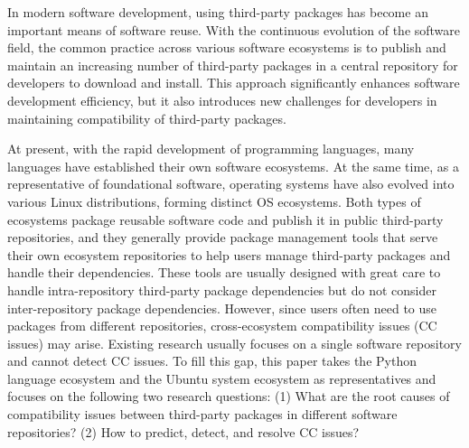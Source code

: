 \begin{eabstract}
In modern software development, using third-party packages has become an important means of software reuse.
With the continuous evolution of the software field, the common practice across various software ecosystems is to publish and maintain an increasing number of third-party packages in a central repository for developers to download and install.
This approach significantly enhances software development efficiency, but it also introduces new challenges for developers in maintaining compatibility of third-party packages.

At present, with the rapid development of programming languages, many languages have established their own software ecosystems. At the same time, as a representative of foundational software, operating systems have also evolved into various Linux distributions, forming distinct OS ecosystems.
Both types of ecosystems package reusable software code and publish it in public third-party repositories, and they generally provide package management tools that serve their own ecosystem repositories to help users manage third-party packages and handle their dependencies.
These tools are usually designed with great care to handle intra-repository third-party package dependencies but do not consider inter-repository package dependencies.
However, since users often need to use packages from different repositories, cross-ecosystem compatibility issues (CC issues) may arise.
Existing research usually focuses on a single software repository and cannot detect CC issues.
To fill this gap, this paper takes the Python language ecosystem and the Ubuntu system ecosystem as representatives and focuses on the following two research questions: (1) What are the root causes of compatibility issues between third-party packages in different software repositories? (2) How to predict, detect, and resolve CC issues?


\end{eabstract}
